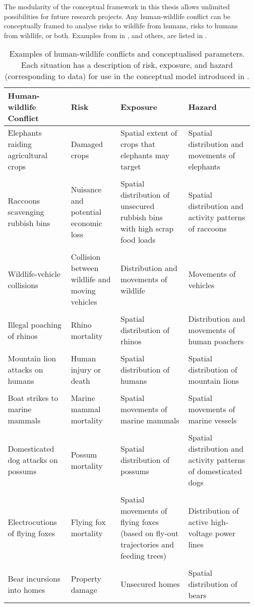 The modularity of the conceptual framework in this thesis allows unlimited possibilities for future research projects. Any human-wildlife conflict can be conceptually framed to analyse risks to wildlife from humans, risks to humans from wildlife, or both. Examples from  in , and others, are listed in .

\begin{table}[h]
\caption[Examples of human-wildlife conflicts and conceptualised parameters]{Examples of human-wildlife conflicts and conceptualised parameters. Each situation has a description of risk, exposure, and hazard (corresponding to data) for use in the conceptual model introduced in .}
\centering
\begin{tabularx}{0.9\textwidth}{YYYY} \toprule
Human-wildlife Conflict					&Risk			&Exposure		&Hazard \\ \midrule
Elephants raiding agricultural crops	&Damaged crops	&Spatial extent of crops that elephants may target	&Spatial distribution and movements of elephants \\
&&& \\
Raccoons scavenging rubbish bins		&Nuisance and potential economic loss	&Spatial distribution of unsecured rubbish bins with high scrap food loads	&Spatial distribution and activity patterns of raccoons \\
&&& \\
Wildlife-vehicle collisions				&Collision between wildlife and moving vehicles	&Distribution and movements of wildlife	&Movements of vehicles \\
&&& \\
Illegal poaching of rhinos				&Rhino mortality	&Spatial distribution of rhinos	&Distribution and movements of human poachers \\
&&& \\
Mountain lion attacks on humans			&Human injury or death	&Spatial distribution of humans	&Spatial distribution of mountain lions \\
&&& \\
Boat strikes to marine mammals			&Marine mammal mortality	&Spatial movements of marine mammals	&Spatial movements of marine vessels \\
&&& \\
Domesticated dog attacks on possums 	&Possum mortality	&Spatial distribution of possums	&Spatial distribution and activity patterns of domesticated dogs \\
&&& \\
Electrocutions of flying foxes			&Flying fox mortality	&Spatial movements of flying foxes (based on fly-out trajectories and feeding trees)	&Distribution of active high-voltage power lines \\
&&& \\
Bear incursions into homes				&Property damage	&Unsecured homes	&Spatial distribution of bears \\
\bottomrule
\end{tabularx}
\label{hmi_risk}
\end{table}


